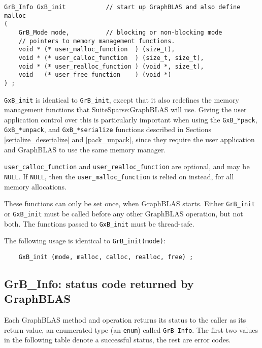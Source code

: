 \documentclass[12pt]{article}
\begin{document}
{\begin{mdframed}[userdefinedwidth=6in]
{\footnotesize
\begin{verbatim}
GrB_Info GxB_init           // start up GraphBLAS and also define malloc
(
    GrB_Mode mode,          // blocking or non-blocking mode
    // pointers to memory management functions.
    void * (* user_malloc_function  ) (size_t),
    void * (* user_calloc_function  ) (size_t, size_t),
    void * (* user_realloc_function ) (void *, size_t),
    void   (* user_free_function    ) (void *)
) ;
\end{verbatim}
}\end{mdframed}

\verb'GxB_init' is identical to \verb'GrB_init', except that it also redefines
the memory management functions that SuiteSparse:GraphBLAS will use.  Giving
the user application control over this is particularly important when using the
\verb'GxB_*pack',
\verb'GxB_*unpack', and \verb'GxB_*serialize' functions described in
Sections \ref{serialize_deserialize} and \ref{pack_unpack},
since they require the user application and
GraphBLAS to use the same memory manager.

\verb'user_calloc_function' and \verb'user_realloc_function' are optional, and
may be \verb'NULL'.  If \verb'NULL', then the \verb'user_malloc_function' is
relied on instead, for all memory allocations.

These functions can only be set once, when GraphBLAS starts.   Either
\verb'GrB_init' or \verb'GxB_init' must be called before any other GraphBLAS
operation, but not both.  The functions passed to \verb'GxB_init' must be
thread-safe.

The following usage is identical to \verb'GrB_init(mode)':

    {\footnotesize
    \begin{verbatim}
    GxB_init (mode, malloc, calloc, realloc, free) ; \end{verbatim}}

\newpage
\subsection{{\sf GrB\_Info:} status code returned by GraphBLAS} %
\label{info}

Each GraphBLAS method and operation returns its status to the caller as its
return value, an enumerated type (an \verb'enum') called \verb'GrB_Info'.  The
first two values in the following table denote a successful status, the rest
are error codes.

}
\end{document}
